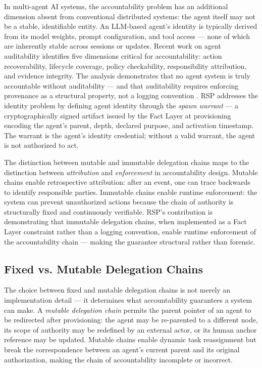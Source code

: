 In multi-agent AI systems, the accountability problem has an additional dimension absent from conventional distributed systems: the agent itself may not be a stable, identifiable entity. An LLM-based agent's identity is typically derived from its model weights, prompt configuration, and tool access --- none of which are inherently stable across sessions or updates. Recent work on agent auditability identifies five dimensions critical for accountability: action recoverability, lifecycle coverage, policy checkability, responsibility attribution, and evidence integrity. The analysis demonstrates that no agent system is truly accountable without auditability --- and that auditability requires enforcing provenance as a structural property, not a logging convention \cite{auditable-agents2026}. RSP addresses the identity problem by defining agent identity through the \emph{spawn warrant} --- a cryptographically signed artifact issued by the Fact Layer at provisioning encoding the agent's parent, depth, declared purpose, and activation timestamp. The warrant is the agent's identity credential; without a valid warrant, the agent is not authorized to act.

The distinction between mutable and immutable delegation chains maps to the distinction between \emph{attribution} and \emph{enforcement} in accountability design. Mutable chains enable retrospective attribution: after an event, one can trace backwards to identify responsible parties. Immutable chains enable runtime enforcement: the system can prevent unauthorized actions because the chain of authority is structurally fixed and continuously verifiable. RSP's contribution is demonstrating that immutable delegation chains, when implemented as a Fact Layer constraint rather than a logging convention, enable runtime enforcement of the accountability chain --- making the guarantee structural rather than forensic.

\subsection{Fixed vs. Mutable Delegation Chains}

The choice between fixed and mutable delegation chains is not merely an implementation detail --- it determines what accountability guarantees a system can make. A \emph{mutable delegation chain} permits the parent pointer of an agent to be redirected after provisioning: the agent may be re-parented to a different node, its scope of authority may be redefined by an external actor, or its human anchor reference may be updated. Mutable chains enable dynamic task reassignment but break the correspondence between an agent's current parent and its original authorization, making the chain of accountability incomplete or incorrect.

